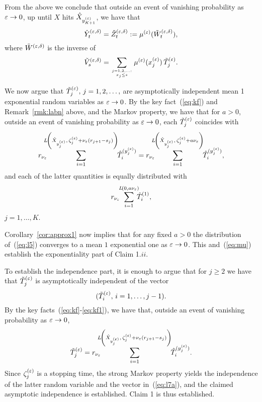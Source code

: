 From the above we conclude that outside an event of vanishing probability as $\varepsilon\to0$, 
up until $X$ hits $\hat X_{y^{(\varepsilon)}_{K+1}}$, we have that
\begin{equation}
\label{eq:tzed}
\byed_t=\bzed_t:=\mue(\bwed_t),
\end{equation}
where $\tilde W^{(\varepsilon,\delta)}$ is the inverse of 
\begin{equation}
\label{eq:l7}
\bved_s=\sum_{j=1,2,\ldots:\atop{x_j\leq s}}\mue(\xe_j)\,\bte_j.
\end{equation}

We now argue that $\tilde T^{(\varepsilon)}_j,\,j=1,2,\ldots,$ are asymptotically 
independent mean 1 exponential random variables as $\varepsilon\to0$.
By the key fact~(\ref{eq:kf}) and Remark~\ref{rmk:labn} above, and the Markov property,
we have that for $a>0$, outside an event of vanishing probability as $\varepsilon\to0$, 
each $\tilde T^{(\varepsilon)}_j$ coincides with
\begin{equation}
r_{\nu_\eps}\!\!\!\!\sum_{i=1}^{L\!\left(\txt_{\yep_j},\,\ze_{j}+\nu_\eps(r_{j+1}-s_j)\right)}\!\!\hat T^{(\yep_j)}_{i}
=r_{\nu_\eps}\!\!\!\!\sum_{i=1}^{L\!\left(\txt_{\yep_j},\,\ze_{j}+a\nu_\eps\right)}\!\!\hat T^{(\yep_j)}_{i},
\end{equation}
and each of the latter quantities is equally distributed with
\begin{equation}
\label{eq:l5}
r_{\nu_\eps}\!\!\sum_{i=1}^{L\!\left(0,a\nu_\eps\right)}\!\!\!\hat T^{(1)}_i,
\end{equation}
$j=1,\ldots,K$.

Corollary~\ref{cor:approx1} %
now implies that for any fixed $a>0$ the distribution of~(\ref{eq:l5})
converges to a mean $1$ exponential one as $\varepsilon\to0$. This and~(\ref{eq:mu}) 
establish the exponentiality part of Claim 1.$ii$.

To establish the independence part, it is enough to argue that for $j\geq2$ we have that $\tilde T^{(\varepsilon)}_j$
is asymptotically independent of the vector 
\begin{equation}
\label{eq:l7a}
(\bte_i,\,i=1,\ldots, j-1).
\end{equation}
By the key facts~(\ref{eq:kf}-\ref{eq:kf1}), we have that,
outside an event of vanishing probability as $\varepsilon\to0$,
\begin{equation}
\tilde T^{(\varepsilon)}_j=
r_{\nu_\varepsilon}\!\!\!\!\sum_{i=1}^{L\!\left(\hat X_{y^{(\varepsilon)}_j},\,\zeta^{(\varepsilon)}_{j}+\nu_\varepsilon(r_{j+1}-s_j)\right)}\!\!\hat T^{(y^{(\varepsilon)}_j)}_{i}.
\end{equation}
Since $\zeta^{(\varepsilon)}_{j}$ is a stopping time, the strong Markov property yields the independence
of the latter random variable and the vector in~(\ref{eq:l7a}), and the claimed asymptotic
independence is established.
Claim 1 is thus established.


